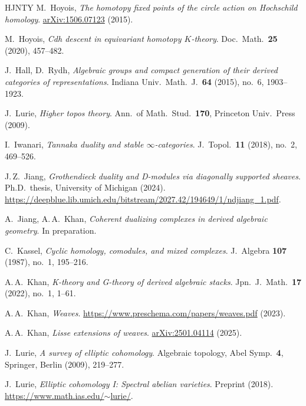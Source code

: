 \documentclass[12pt, oneside]{amsart}
\newcommand\arXiv[1]{\href{http://arxiv.org/abs/#1}{arXiv:#1}}
\numberwithin{equation}{section}
\theoremstyle{remark}
\theoremstyle{plain}
\begin{document}
\begin{thebibliography}{HJNTY}
   M.~Hoyois, \textit{The homotopy fixed points of the circle action on Hochschild homology}. \arXiv{1506.07123} (2015).

   M.~Hoyois, \textit{Cdh descent in equivariant homotopy $K$-theory}. Doc.\ Math.\ {\bf{25}} (2020), 457--482.

   J.~Hall, D.~Rydh, \textit{Algebraic groups and compact generation of their derived categories of representations}. Indiana Univ.\ Math.\ J.\ {\bf{64}} (2015), no.~6, 1903--1923.

   J.~Lurie, \textit{Higher topos theory}. Ann.\ of Math.\ Stud.\ {\bf{170}}, Princeton Univ.\ Press (2009).

   I.~Iwanari, \textit{Tannaka duality and stable $\infty$-categories}. J.\ Topol.\ {\bf{11}} (2018), no.~2, 469--526.

   J.\,Z.~Jiang, \textit{Grothendieck duality and D-modules via diagonally supported sheaves}. Ph.D.\ thesis, University of Michigan (2024). \href{https://deepblue.lib.umich.edu/bitstream/2027.42/194649/1/ndjiang_1.pdf}{https://deepblue.lib.umich.edu/bitstream/2027.42/194649/1/ndjiang\_1.pdf}.

   A.~Jiang, A.\,A.~Khan, \textit{Coherent dualizing complexes in derived algebraic geometry}. In preparation.

   C.~Kassel, \textit{Cyclic homology, comodules, and mixed complexes}. J.\ Algebra {\bf{107}} (1987), no.~1, 195--216.

   A.\,A.~Khan, \textit{K-theory and G-theory of derived algebraic stacks}. Jpn.\ J.\ Math.\ {\bf{17}} (2022), no.~1, 1--61.

   A.\,A.~Khan, \textit{Weaves}. \href{https://www.preschema.com/papers/weaves.pdf}{https://www.preschema.com/papers/weaves.pdf} (2023).

   A.\,A.~Khan, \textit{Lisse extensions of weaves}. \arXiv{2501.04114} (2025).

   J.~Lurie, \textit{A survey of elliptic cohomology}. Algebraic topology, Abel Symp.\ {\bf{4}}, Springer, Berlin (2009), 219--277.

   J.~Lurie, \textit{Elliptic cohomology I: Spectral abelian varieties}. Preprint (2018). \href{https://www.math.ias.edu/~lurie/}{https://www.math.ias.edu/$\sim$lurie/}.


\end{thebibliography}
\end{document}

